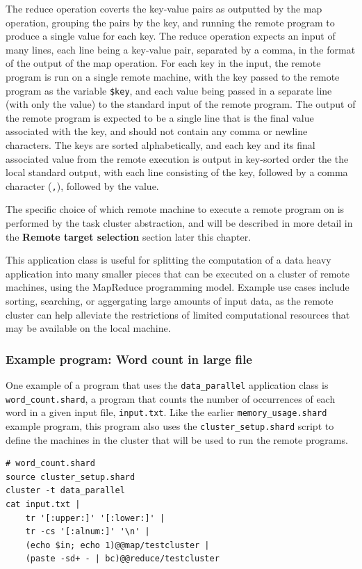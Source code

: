 \documentclass[twoside]{report}
\begin{document}
The reduce operation coverts the key-value pairs as outputted by the map operation, grouping the pairs by the key, and running the remote program to produce a single value for each key.
The reduce operation expects an input of many lines, each line being a key-value pair, separated by a comma, in the format of the output of the map operation.
For each key in the input, the remote program is run on a single remote machine, with the key passed to the remote program as the variable \texttt{\$key}, and each value being passed in a separate line (with only the value) to the standard input of the remote program.
The output of the remote program is expected to be a single line that is the final value associated with the key, and should not contain any comma or newline characters.
The keys are sorted alphabetically, and each key and its final associated value from the remote execution is output in key-sorted order the the local standard output, with each line consisting of the key, followed by a comma character (\texttt{,}), followed by the value.

The specific choice of which remote machine to execute a remote program on is performed by the task cluster abstraction, and will be described in more detail in the \textbf{Remote target selection} section later this chapter.

This application class is useful for splitting the computation of a data heavy application into many smaller pieces that can be executed on a cluster of remote machines, using the MapReduce programming model.
Example use cases include sorting, searching, or aggergating large amounts of input data, as the remote cluster can help alleviate the restrictions of limited computational resources that may be available on the local machine.

\subsubsection{Example program: Word count in large file}

One example of a program that uses the \texttt{data\_parallel} application class is \texttt{word\_count.shard}, a program that counts the number of occurrences of each word in a given input file, \texttt{input.txt}.
Like the earlier \texttt{memory\_usage.shard} example program, this program also uses the \texttt{cluster\_setup.shard} script to define the machines in the cluster that will be used to run the remote programs.

\begin{minipage}[c]{\textwidth-15pt}
  \begin{lstlisting}[language=Shard]
# word_count.shard
source cluster_setup.shard
cluster -t data_parallel
cat input.txt |
    tr '[:upper:]' '[:lower:]' |
    tr -cs '[:alnum:]' '\n' |
    (echo $in; echo 1)@@map/testcluster |
    (paste -sd+ - | bc)@@reduce/testcluster
\end{lstlisting}
  \smallskip
\end{minipage}
\end{document}

